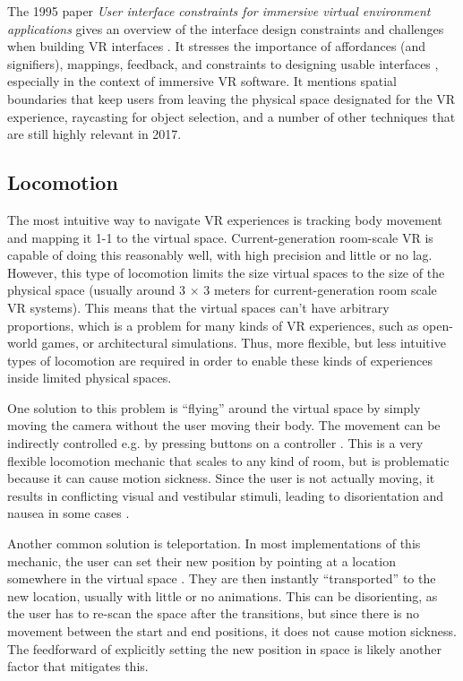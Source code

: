 \documentclass{tufte-book} %
\begin{document}
The 1995 paper \emph{User interface constraints for immersive virtual environment applications} gives an overview of the interface design constraints and challenges when building VR interfaces \cite{bowman1995user}. It stresses the importance of affordances (and signifiers), mappings, feedback, and constraints to designing usable interfaces \cite{norman2013design}, especially in the context of immersive VR software. It mentions spatial boundaries that keep users from leaving the physical space designated for the VR experience, raycasting for object selection, and a number of other techniques that are still highly relevant in 2017.

\subsection{Locomotion}
The most intuitive way to navigate VR experiences is tracking body movement and mapping it 1-1 to the virtual space. Current-generation room-scale VR is capable of doing this reasonably well, with high precision and little or no lag. However, this type of locomotion limits the size virtual spaces to the size of the physical space (usually around $3$ $\times$ $3$ meters for current-generation room scale VR systems). This means that the virtual spaces can't have arbitrary proportions, which is a problem for many kinds of VR experiences, such as open-world games, or architectural simulations. Thus, more flexible, but less intuitive types of locomotion are required in order to enable these kinds of experiences inside limited physical spaces.

One solution to this problem is ``flying'' around the virtual space by simply moving the camera without the user moving their body. The movement can be indirectly controlled e.g. by pressing buttons on a controller \cite{bowman1996evaluation} \cite{bowman1995user}. This is a very flexible locomotion mechanic that scales to any kind of room, but is problematic because it can cause motion sickness. Since the user is not actually moving, it results in conflicting visual and vestibular stimuli, leading to disorientation and nausea in some cases \cite{akiduki2003visual}.

Another common solution is teleportation. In most implementations of this mechanic, the user can set their new position by pointing at a location somewhere in the virtual space \cite{bozgeyikli2016point}. They are then instantly ``transported'' to the new location, usually with little or no animations. This can be disorienting, as the user has to re-scan the space after the transitions, but since there is no movement between the start and end positions, it does not cause motion sickness. The feedforward of explicitly setting the new position in space is likely another factor that mitigates this.
\end{document}
